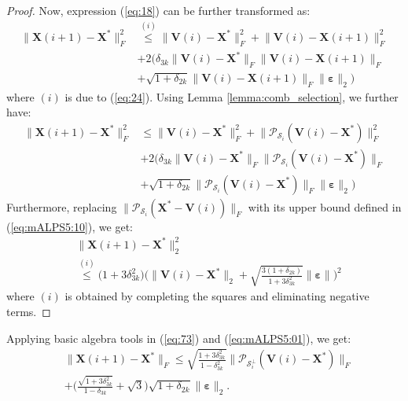 \documentclass[twocolumn]{svjour3}
\newcommand{\vectornormbig}[1]{\big\|#1\big\|}
\newcommand{\signal}{\boldsymbol{X}}
\newcommand{\bestsignal}{\boldsymbol{X}^\ast}
\newcommand{\noise}{\boldsymbol{\varepsilon}}
\newcommand{\rank}{k}
\begin{document}
\begin{proof}
Now, expression (\ref{eq:18}) can be further transformed as:
\begin{align}
\vectornormbig{\signal(i+1)  - \bestsignal}_F^2 
										&\stackrel{(i)}{\leq} \vectornormbig{\boldsymbol{V}(i) - \bestsignal}_F^2 + \vectornormbig{\boldsymbol{V}(i) - \signal(i+1) }_F^2 \nonumber \\ &+  2(\delta_{3\rank} \vectornormbig{\boldsymbol{V}(i) - \bestsignal}_F \vectornormbig{\boldsymbol{V}(i) - \signal(i+1) }_F \nonumber \\ &+ \sqrt{1+\delta_{2\rank}} \vectornormbig{\boldsymbol{V}(i) - \signal(i+1) }_F \vectornormbig{\noise}_2) \label{eq:25b}										                                       
\end{align} where $ (i) $ is due to (\ref{eq:24}). Using Lemma \ref{lemma:comb_selection}, we further have:
\begin{align}
\vectornormbig{\signal(i+1)  - \bestsignal}_F^2 &\leq  \vectornormbig{\boldsymbol{V}(i) - \bestsignal}_F^2 + \vectornormbig{\mathcal{P}_{\mathcal{S}_i}(\boldsymbol{V}(i) - \bestsignal)}_F^2 \nonumber \\ &+  2\Big(\delta_{3\rank} \vectornormbig{\boldsymbol{V}(i) - \bestsignal}_F \vectornormbig{\mathcal{P}_{\mathcal{S}_i}(\boldsymbol{V}(i) - \bestsignal)}_F \nonumber \\ &+ \sqrt{1+\delta_{2\rank}} \vectornormbig{\mathcal{P}_{\mathcal{S}_i}(\boldsymbol{V}(i) - \bestsignal)}_F \vectornormbig{\noise}_2\Big) \label{eq:mALPS5:20}
\end{align} Furthermore, replacing $ \vectornormbig{\mathcal{P}_{\mathcal{S}_i}(\bestsignal - \boldsymbol{V}(i))}_F $ with its upper bound defined in (\ref{eq:mALPS5:10}), we get:
\begin{align}
&\vectornormbig{\signal(i+1)  - \bestsignal}_2^2 \nonumber \\
															   &\stackrel{(i)}{\leq} \Big(1 + 3\delta_{3\rank}^2\Big)\Bigg(\vectornormbig{\boldsymbol{V}(i) - \bestsignal}_2 + \sqrt{\frac{3(1+\delta_{2\rank})}{1 + 3\delta_{3\rank}^2}}\vectornormbig{\noise}\Bigg)^2 \label{eq:73a}
\end{align} where $ (i) $ is obtained by completing the squares and eliminating negative terms. 
\end{proof}

Applying basic algebra tools in (\ref{eq:73}) and (\ref{eq:mALPS5:01}), we get:
\begin{align}
&\vectornormbig{\signal(i+1) - \bestsignal}_F \leq \sqrt{\frac{1+3\delta_{3\rank}^2}{1-\delta_{3\rank}^2}}\vectornormbig{\mathcal{P}_{\mathcal{S}_i^{\bot}}(\boldsymbol{V}(i) - \bestsignal)}_F \nonumber \\ &+ \Big(\frac{\sqrt{1+3\delta_{3\rank}^2}}{1-\delta_{3\rank}} + \sqrt{3}\Big)\sqrt{1+\delta_{2\rank}}\vectornormbig{\noise}_2. \nonumber
\end{align} 
\end{document}

